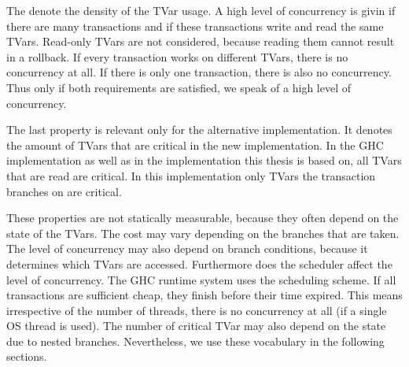 The  denote the density of the TVar usage. A high level of 
concurrency is givin if there are many transactions and if these transactions write and read the same
TVars. Read-only TVars are not considered, because reading them cannot result in a rollback.
If every transaction works on different TVars, there is no concurrency at all. If there 
is only one transaction, there is also no concurrency. Thus only if both requirements are satisfied,
we speak of a high level of concurrency. 

The last property is relevant only for the alternative implementation. It denotes the amount of TVars that 
are critical in the new implementation. In the GHC implementation as well as in the implementation
this thesis is based on, all TVars that are read are critical. In this implementation only TVars the 
transaction branches on are critical. 

These properties are not statically measurable, because they often depend on the state of the TVars. 
The cost may vary depending on the branches that are taken. The level of concurrency may also 
depend on branch conditions, because it determines which TVars are accessed. Furthermore does 
the scheduler affect the level of concurrency. The GHC runtime system uses the 
scheduling scheme. If all transactions are sufficient cheap, they finish before their time expired.
This means irrespective of the number of threads, there is no concurrency at all (if a single OS thread
is used). The number of critical TVar may also depend on the state due to nested branches.
Nevertheless, we use these vocabulary in the following sections.

